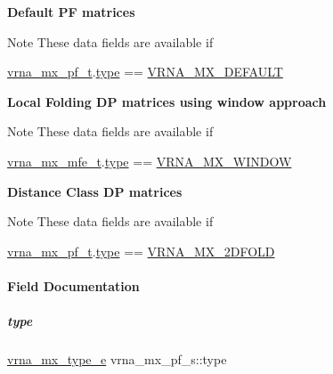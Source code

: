\begin{Indent}\textbf{ Default PF matrices}\par
{\em \begin{DoxyNote}{Note}
These data fields are available if 
\begin{DoxyCode}
\mbox{\hyperlink{group__dp__matrices_structvrna__mx__pf__s}{vrna\_mx\_pf\_t}}.\mbox{\hyperlink{group__dp__matrices_a74ba745d6fc4ac5d437bc24450ea789c}{type}} == \mbox{\hyperlink{group__dp__matrices_gga6042ea1d58d01931e959791be6d89343aafa2568956dab79595521e20c49a5f75}{VRNA\_MX\_DEFAULT}} 
\end{DoxyCode}
 
\end{DoxyNote}
}\end{Indent}
\begin{Indent}\textbf{ Local Folding DP matrices using window approach}\par
{\em \begin{DoxyNote}{Note}
These data fields are available if 
\begin{DoxyCode}
\mbox{\hyperlink{group__dp__matrices_structvrna__mx__mfe__s}{vrna\_mx\_mfe\_t}}.\mbox{\hyperlink{group__dp__matrices_a468680aa937b664d453075108d976ae2}{type}} == \mbox{\hyperlink{group__dp__matrices_gga6042ea1d58d01931e959791be6d89343a2ea5d5947f6ec02544934b0ff2785e99}{VRNA\_MX\_WINDOW}} 
\end{DoxyCode}
 
\end{DoxyNote}
}\end{Indent}
\begin{Indent}\textbf{ Distance Class DP matrices}\par
{\em \begin{DoxyNote}{Note}
These data fields are available if 
\begin{DoxyCode}
\mbox{\hyperlink{group__dp__matrices_structvrna__mx__pf__s}{vrna\_mx\_pf\_t}}.\mbox{\hyperlink{group__dp__matrices_a74ba745d6fc4ac5d437bc24450ea789c}{type}} == \mbox{\hyperlink{group__dp__matrices_gga6042ea1d58d01931e959791be6d89343ae656f8391445ff71bed8a597a0a19417}{VRNA\_MX\_2DFOLD}} 
\end{DoxyCode}
 
\end{DoxyNote}
}\end{Indent}


\paragraph{Field Documentation}
\mbox{\label{group__dp__matrices_a74ba745d6fc4ac5d437bc24450ea789c}} 
\subparagraph{\texorpdfstring{type}{type}}
{\footnotesize\ttfamily \mbox{\hyperlink{group__dp__matrices_ga6042ea1d58d01931e959791be6d89343}{vrna\+\_\+mx\+\_\+type\+\_\+e}} vrna\+\_\+mx\+\_\+pf\+\_\+s\+::type}


